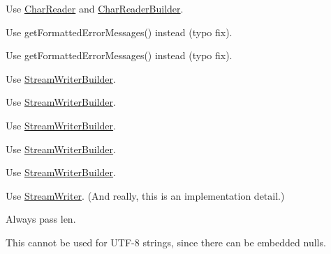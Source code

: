 
\begin{DoxyRefList}
\item[\label{deprecated__deprecated000005}%
\Hypertarget{deprecated__deprecated000005}%
Member \hyperlink{namespaceJson_a61b556ffe4c70c4492a9dbe4718ec50b}{Json\+:\+:J\+S\+O\+N\+C\+P\+P\+\_\+\+D\+E\+P\+R\+E\+C\+A\+T\+ED} (\char`\"{}\+Use Char\+Reader and Char\+Reader\+Builder instead\char`\"{}) J\+S\+O\+N\+\_\+\+A\+PI Reader]Use \hyperlink{classJson_1_1CharReader}{Char\+Reader} and \hyperlink{classJson_1_1CharReaderBuilder}{Char\+Reader\+Builder}. 

Use get\+Formatted\+Error\+Messages() instead (typo fix). 

Use get\+Formatted\+Error\+Messages() instead (typo fix).  
\item[\label{deprecated__deprecated000008}%
\Hypertarget{deprecated__deprecated000008}%
Member \hyperlink{namespaceJson_a9013c5f4f4ff260225b101a18af45262}{Json\+:\+:J\+S\+O\+N\+C\+P\+P\+\_\+\+D\+E\+P\+R\+E\+C\+A\+T\+ED} (\char`\"{}\+Use Stream\+Writer\+Builder instead\char`\"{}) J\+S\+O\+N\+\_\+\+A\+PI Styled\+Stream\+Writer]Use \hyperlink{classJson_1_1StreamWriterBuilder}{Stream\+Writer\+Builder}. 

Use \hyperlink{classJson_1_1StreamWriterBuilder}{Stream\+Writer\+Builder}. 

Use \hyperlink{classJson_1_1StreamWriterBuilder}{Stream\+Writer\+Builder}. 

Use \hyperlink{classJson_1_1StreamWriterBuilder}{Stream\+Writer\+Builder}. 

Use \hyperlink{classJson_1_1StreamWriterBuilder}{Stream\+Writer\+Builder}.  
\item[\label{deprecated__deprecated000007}%
\Hypertarget{deprecated__deprecated000007}%
Member \hyperlink{namespaceJson_a677dd20047c0c6e4eb16c5f1b53f703c}{Json\+:\+:J\+S\+O\+N\+C\+P\+P\+\_\+\+D\+E\+P\+R\+E\+C\+A\+T\+ED} (\char`\"{}\+Use Stream\+Writer instead\char`\"{}) J\+S\+O\+N\+\_\+\+A\+PI Writer]Use \hyperlink{classJson_1_1StreamWriter}{Stream\+Writer}. (And really, this is an implementation detail.)  
\item[\label{deprecated__deprecated000002}%
\Hypertarget{deprecated__deprecated000002}%
Member \hyperlink{classJson_1_1Value_a8a660202bbad35857b39e85bd35ec78a}{Json\+:\+:Value\+:\+:remove\+Member} (const J\+S\+O\+N\+C\+P\+P\+\_\+\+S\+T\+R\+I\+NG \&key)]
\item[\label{deprecated__deprecated000001}%
\Hypertarget{deprecated__deprecated000001}%
Member \hyperlink{classJson_1_1Value_a92e165f04105d27a930fb3a18a053585}{Json\+:\+:Value\+:\+:remove\+Member} (const char $\ast$key)]
\item[\label{deprecated__deprecated000003}%
\Hypertarget{deprecated__deprecated000003}%
Member \hyperlink{classJson_1_1Value_a29f3a30f7e5d3af6f38d57999bf5b480}{Json\+:\+:Value\+:\+:set\+Comment} (const char $\ast$comment, Comment\+Placement placement)]Always pass len.  
\item[\label{deprecated__deprecated000004}%
\Hypertarget{deprecated__deprecated000004}%
Member \hyperlink{classJson_1_1ValueIteratorBase_a54765da6759fd3f1edcbfbaf308ec263}{Json\+:\+:Value\+Iterator\+Base\+:\+:member\+Name} () const]This cannot be used for U\+T\+F-\/8 strings, since there can be embedded nulls. 
\end{DoxyRefList}